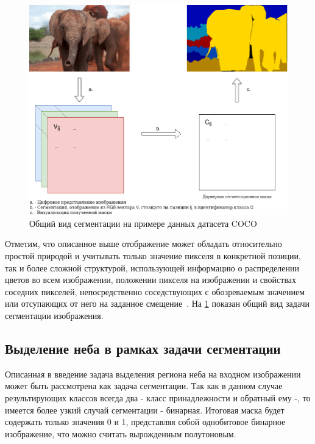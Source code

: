 \begin{figure}[H]
 \centering
 \includegraphics[width=\textwidth]{img/example_segmentation.png}
 \caption{Общий вид сегментации на примере данных датасета COCO}
 \label{fig:seg_example}
\end{figure}

Отметим, что описанное выше отображение может обладать относительно простой природой и учитывать только значение пикселя в конкретной позиции, так и более сложной структурой, использующей информацию о распределении цветов во всем изображении, положении пикселя на изображении и свойствах соседних пикселей, непосредственно соседствующих с обозреваемым значением или отсупающих от него на заданное смещение~\autocite{liu2018recent}. На \ref{fig:seg_example} показан общий вид задачи сегментации изображения.



\subsection{Выделение неба в рамках задачи сегментации}

Описанная в введение задача выделения региона неба на входном изображении может быть рассмотрена как задача сегментации. Так как в данном случае результирующих классов всегда два - класс принадлежности и обратный ему -, то имеется более узкий случай сегментации - бинарная. Итоговая маска будет содержать только значения 0 и 1, представляя собой однобитовое бинарное изображение, что можно считать вырожденным полутоновым.


